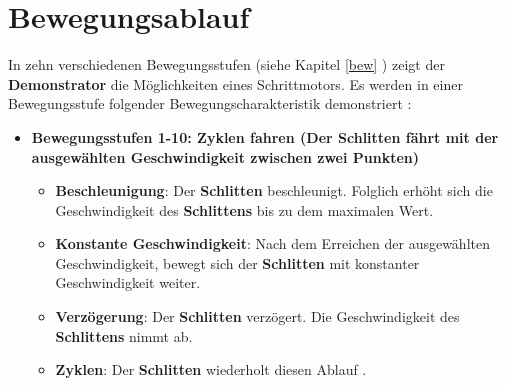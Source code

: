 %
%


\chapter{Bewegungsablauf}

In zehn verschiedenen Bewegungsstufen (siehe Kapitel \ref{bew} ) zeigt der \textbf{Demonstrator} die Möglichkeiten eines Schrittmotors. Es werden in einer Bewegungsstufe folgender Bewegungscharakteristik demonstriert :  

\begin{itemize}
	\item \textbf{Bewegungsstufen 1-10: Zyklen fahren (Der \textbf{Schlitten} fährt mit der ausgewählten Geschwindigkeit zwischen zwei Punkten)}
	\begin{itemize}
		\item\textbf{Beschleunigung}: Der \textbf{Schlitten} beschleunigt. Folglich erhöht sich die Geschwindigkeit des \textbf{Schlittens} bis zu dem maximalen Wert. 
		\item\textbf{Konstante Geschwindigkeit}: Nach dem Erreichen der ausgewählten Geschwindigkeit, bewegt sich der \textbf{Schlitten} mit konstanter Geschwindigkeit weiter.
		\item\textbf{Verzögerung}: Der \textbf{Schlitten} verzögert. Die Geschwindigkeit des \textbf{Schlittens} nimmt ab.
		\item\textbf{Zyklen}: Der \textbf{Schlitten} wiederholt diesen Ablauf .
	\end{itemize}
\end{itemize}



